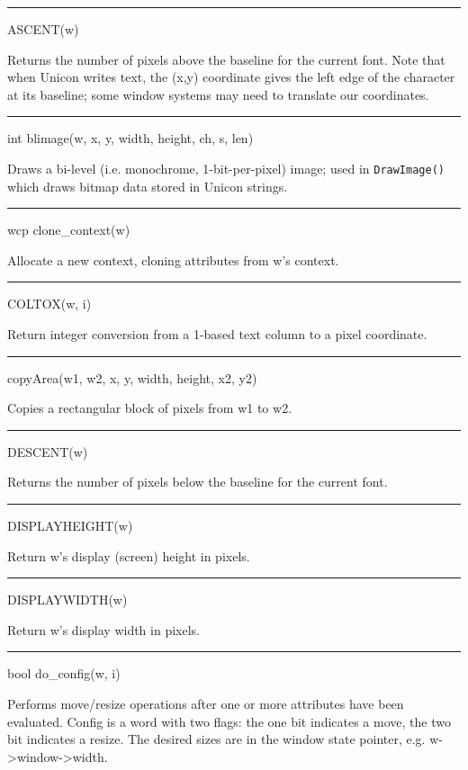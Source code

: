 {\sffamily\bfseries
\bigskip\hrule\vspace{0.1cm}
\noindent
ASCENT(w)}


Returns the number of pixels above the baseline for the current
font. Note that when Unicon writes text, the (x,y) coordinate gives
the left edge of the character at its baseline; some window systems
may need to translate our coordinates.

{\sffamily\bfseries
\bigskip\hrule\vspace{0.1cm}
\noindent
int blimage(w, x, y, width, height, ch, s, len)}

Draws a bi-level (i.e. monochrome, 1-bit-per-pixel) image; used in
\texttt{DrawImage()} which draws bitmap data stored in Unicon strings.

{\sffamily\bfseries
\bigskip\hrule\vspace{0.1cm}
\noindent
wcp clone\_context(w)}


Allocate a new context, cloning attributes from w's context.

{\sffamily\bfseries
\bigskip\hrule\vspace{0.1cm}
\noindent
COLTOX(w, i)}


Return integer conversion from a 1-based text column to a pixel coordinate.

{\sffamily\bfseries
\bigskip\hrule\vspace{0.1cm}
\noindent
copyArea(w1, w2, x, y, width, height, x2, y2)}


Copies a rectangular block of pixels from w1 to w2.

{\sffamily\bfseries
\bigskip\hrule\vspace{0.1cm}
\noindent
DESCENT(w)}


Returns the number of pixels below the baseline for the current font.


{\sffamily\bfseries
\bigskip\hrule\vspace{0.1cm}
\noindent
DISPLAYHEIGHT(w)}


Return w's display (screen) height in pixels.

{\sffamily\bfseries
\bigskip\hrule\vspace{0.1cm}
\noindent
DISPLAYWIDTH(w)}


Return w's display width in pixels.

{\sffamily\bfseries
\bigskip\hrule\vspace{0.1cm}
\noindent
bool do\_config(w, i)}


Performs move/resize operations after one or more attributes have been
evaluated. Config is a word with two flags: the one bit indicates a
move, the two bit indicates a resize. The desired sizes are in the
window state pointer, e.g.
w-{\textgreater}window-{\textgreater}width.

